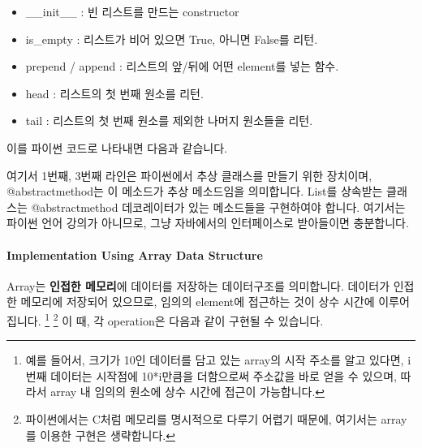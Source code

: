 \documentclass[titlepage]{report}
\begin{document}
\begin{itemize} 
\item \_\_init\_\_ : 빈 리스트를 만드는 constructor
\item is\_empty : 리스트가 비어 있으면 True, 아니면 False를 리턴. 
\item prepend / append : 리스트의 앞/뒤에 어떤 element를 넣는 함수. 
\item head : 리스트의 첫 번째 원소를 리턴. 
\item tail : 리스트의 첫 번째 원소를 제외한 나머지 원소들을 리턴. 
\end{itemize}

이를 파이썬 코드로 나타내면 다음과 같습니다. 

 

여기서 1번째, 3번째 라인은 파이썬에서 추상 클래스를 만들기 위한 장치이며, @abstractmethod는 이 메소드가 추상 메소드임을 의미합니다. List를 상속받는 클래스는 @abstractmethod 데코레이터가 있는 메소드들을 구현하여야 합니다. 여기서는 파이썬 언어 강의가 아니므로, 그냥 자바에서의 인터페이스로 받아들이면 충분합니다. 

\paragraph{Implementation Using Array Data Structure} 

Array는 \textbf{인접한 메모리}에 데이터를 저장하는 데이터구조를 의미합니다. 데이터가 인접한 메모리에 저장되어 있으므로, 임의의 element에 접근하는 것이 상수 시간에 이루어집니다. \footnote{예를 들어서, 크기가 10인 데이터를 담고 있는 array의 시작 주소를 알고 있다면, i번째 데이터는 시작점에 10*i만큼을 더함으로써 주소값을 바로 얻을 수 있으며, 따라서 array 내 임의의 원소에 상수 시간에 접근이 가능합니다.} \footnote{파이썬에서는 C처럼 메모리를 명시적으로 다루기 어렵기 때문에, 여기서는 array를 이용한 구현은 생략합니다.} 이 때, 각 operation은 다음과 같이 구현될 수 있습니다. 
\end{document}
